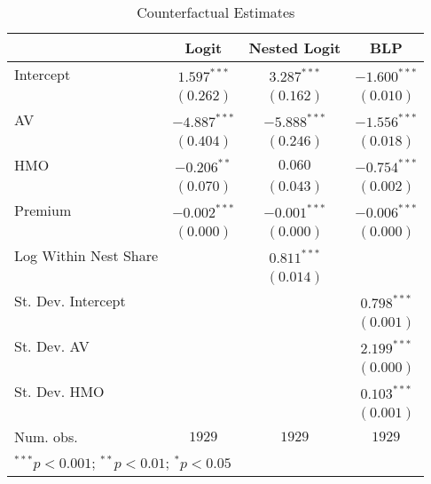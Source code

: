 
\begin{table}
\caption{Counterfactual Estimates}
\begin{center}
\begin{tabular}{l c c c}
\hline
 & Logit & Nested Logit & BLP \\
\hline
Intercept             & $1.597^{***}$  & $3.287^{***}$  & $-1.600^{***}$ \\
                      & $(0.262)$      & $(0.162)$      & $(0.010)$      \\
AV                    & $-4.887^{***}$ & $-5.888^{***}$ & $-1.556^{***}$ \\
                      & $(0.404)$      & $(0.246)$      & $(0.018)$      \\
HMO                   & $-0.206^{**}$  & $0.060$        & $-0.754^{***}$ \\
                      & $(0.070)$      & $(0.043)$      & $(0.002)$      \\
Premium               & $-0.002^{***}$ & $-0.001^{***}$ & $-0.006^{***}$ \\
                      & $(0.000)$      & $(0.000)$      & $(0.000)$      \\
Log Within Nest Share &                & $0.811^{***}$  &                \\
                      &                & $(0.014)$      &                \\
St. Dev. Intercept    &                &                & $0.798^{***}$  \\
                      &                &                & $(0.001)$      \\
St. Dev. AV           &                &                & $2.199^{***}$  \\
                      &                &                & $(0.000)$      \\
St. Dev. HMO          &                &                & $0.103^{***}$  \\
                      &                &                & $(0.001)$      \\
\hline
Num. obs.             & $1929$         & $1929$         & $1929$         \\
\hline
\multicolumn{4}{l}{\scriptsize{$^{***}p<0.001$; $^{**}p<0.01$; $^{*}p<0.05$}}
\end{tabular}
\label{table:coefficients}
\end{center}
\end{table}

